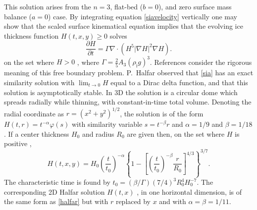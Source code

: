 \documentclass[letterpaper,final,12pt,reqno]{amsart}
\newcommand{\grad}{\nabla}
\newcommand{\Div}{\nabla\cdot}
\newcommand{\rhoi}{\rho_{\text{i}}}
\begin{document}
This solution arises from the $n=3$, flat-bed ($b=0$), and zero surface mass balance ($a=0$) case.  By integrating equation \eqref{siavelocity} vertically one may show that the scaled surface kinematical equation implies that the evolving ice thickness function $H(t,x,y)\ge 0$ solves
\begin{equation}
\frac{\partial H}{\partial t} = \Gamma \Div \left(H^5 |\grad H|^2 \grad H\right). \label{sia}
\end{equation}
on the set where $H>0$ \cite{Fowler1997}, where $\Gamma = \frac{2}{5} A_3 (\rhoi g)^3$.  References \cite{Bueler2016,Calvoetal2002,JouvetBueler2012} consider the rigorous meaning of this free boundary problem.  P.~Halfar \cite{Halfar1981} observed that \eqref{sia} has an exact similarity solution with $\lim_{t\to 0} H$ equal to a Dirac delta function, and that this solution is asymptotically stable.  In 3D \cite{Halfar1983} the solution is a circular dome which spreads radially while thinning, with constant-in-time total volume.  Denoting the radial coordinate as $r=(x^2+y^2)^{1/2}$, the solution is of the form $H(t,r) = t^{-\alpha} \varphi(s)$ with similarity variable $s=t^{-\beta} r$ and $\alpha=1/9$ and $\beta=1/18$.  If a center thickness $H_0$ and radius $R_0$ are given then, on the set where $H$ is positive \cite{Bueleretal2005},
\begin{equation}
H(t,x,y) = H_0 \left(\frac{t}{t_0}\right)^{-\alpha} \left\{1 - \left[\left(\frac{t}{t_0}\right)^{-\beta} \frac{r}{R_0}\right]^{4/3}\right\}^{3/7}. \label{halfar}
\end{equation}
The characteristic time is found by $t_0 = (\beta/\Gamma) (7/4)^3 R_0^4 H_0^{-7}$.  The corresponding 2D Halfar solution $H(t,x)$ \cite{Halfar1981}, in one horizontal dimension, is of the same form as \eqref{halfar} but with $r$ replaced by $x$ and with $\alpha=\beta=1/11$.

\small

\bigskip


\end{document}

